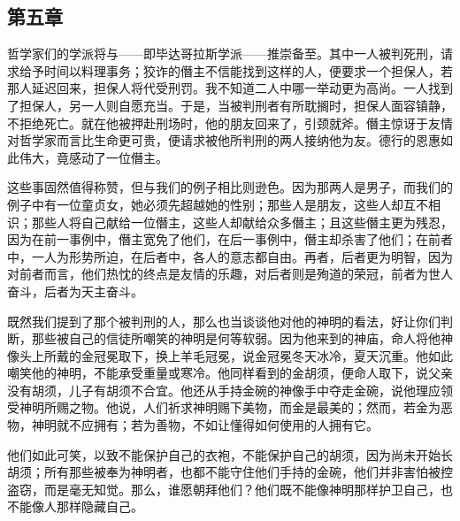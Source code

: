 
\subsection{第五章}

\par

哲学家们的学派将与——即毕达哥拉斯学派——推崇备至。其中一人被判死刑，请求给予时间以料理事务；狡诈的僭主不信能找到这样的人，便要求一个担保人，若那人延迟回来，担保人将代受刑罚。我不知道二人中哪一举动更为高尚。一人找到了担保人，另一人则自愿充当。于是，当被判刑者有所耽搁时，担保人面容镇静，不拒绝死亡。就在他被押赴刑场时，他的朋友回来了，引颈就斧。僭主惊讶于友情对哲学家而言比生命更可贵，便请求被他所判刑的两人接纳他为友。德行的恩惠如此伟大，竟感动了一位僭主。\par

这些事固然值得称赞，但与我们的例子相比则逊色。因为那两人是男子，而我们的例子中有一位童贞女，她必须先超越她的性别；那些人是朋友，这些人却互不相识；那些人将自己献给一位僭主，这些人却献给众多僭主；且这些僭主更为残忍，因为在前一事例中，僭主宽免了他们，在后一事例中，僭主却杀害了他们；在前者中，一人为形势所迫，在后者中，各人的意志都自由。再者，后者更为明智，因为对前者而言，他们热忱的终点是友情的乐趣，对后者则是殉道的荣冠，前者为世人奋斗，后者为天主奋斗。\par

既然我们提到了那个被判刑的人，那么也当谈谈他对他的神明的看法，好让你们判断，那些被自己的信徒所嘲笑的神明是何等软弱。因为他来到的神庙，命人将他神像头上所戴的金冠冕取下，换上羊毛冠冕，说金冠冕冬天冰冷，夏天沉重。他如此嘲笑他的神明，不能承受重量或寒冷。他同样看到的金胡须，便命人取下，说父亲没有胡须，儿子有胡须不合宜。他还从手持金碗的神像手中夺走金碗，说他理应领受神明所赐之物。他说，人们祈求神明赐下美物，而金是最美的；然而，若金为恶物，神明就不应拥有；若为善物，不如让懂得如何使用的人拥有它。\par

他们如此可笑，以致不能保护自己的衣袍，不能保护自己的胡须，因为尚未开始长胡须；所有那些被奉为神明者，也都不能守住他们手持的金碗，他们并非害怕被控盗窃，而是毫无知觉。那么，谁愿朝拜他们？他们既不能像神明那样护卫自己，也不能像人那样隐藏自己。\par

